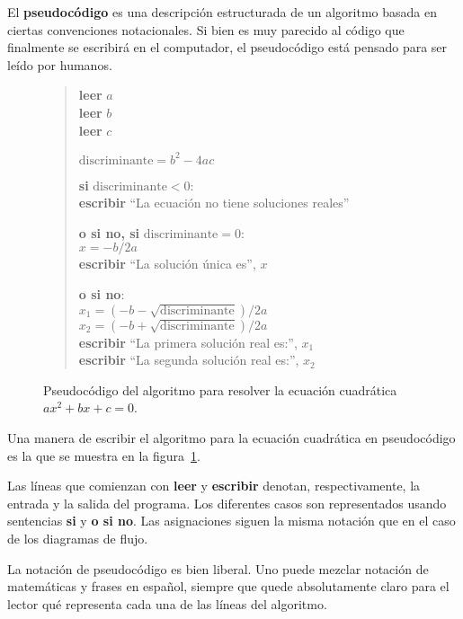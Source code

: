 El \textbf{pseudocódigo} es una descripción estructurada de un algoritmo
basada en ciertas convenciones notacionales. Si bien es muy parecido al
código que finalmente se escribirá en el computador, el pseudocódigo
está pensado para ser leído por humanos.

\begin{figure}
  \centering
  \begin{verse}
    \textbf{leer} \(a\)\\
    \textbf{leer} \(b\)\\
    \textbf{leer} \(c\)

    \(\text{discriminante} = b^2 - 4ac\)

    \textbf{si} \(\text{discriminante} < 0\):\\
    \qquad\textbf{escribir} ``La ecuación no tiene soluciones reales''

    \textbf{o si no, si} \(\text{discriminante} = 0\):\\
    \qquad\(x = -b / 2a\)\\
    \qquad\textbf{escribir} ``La solución única es'', \(x\)

    \textbf{o si no}:\\
    \qquad\(x_1 = (-b - \sqrt{\text{discriminante}}) / 2a\)\\
    \qquad\(x_2 = (-b + \sqrt{\text{discriminante}}) / 2a\)\\
    \qquad\textbf{escribir} ``La primera solución real es:'', \(x_1\)\\
    \qquad\textbf{escribir} ``La segunda solución real es:'', \(x_2\)
  \end{verse}
  \caption{Pseudocódigo del algoritmo para resolver
    la ecuación cuadrática \(ax^2 + bx + c = 0\).}
  \label{fig:pseudocodigo-cuadratica}
\end{figure}

Una manera de escribir el algoritmo para la ecuación cuadrática en
pseudocódigo es la que se muestra en la figura~\ref{fig:pseudocodigo-cuadratica}.

Las líneas que comienzan con \textbf{leer} y \textbf{escribir}
denotan, respectivamente, la entrada y la salida del programa. Los
diferentes casos son representados usando sentencias \textbf{si} y
\textbf{o si no}. Las asignaciones siguen la misma notación que en el
caso de los diagramas de flujo.

La notación de pseudocódigo es bien liberal. Uno puede mezclar notación
de matemáticas y frases en español, siempre que quede absolutamente
claro para el lector qué representa cada una de las líneas del
algoritmo.

